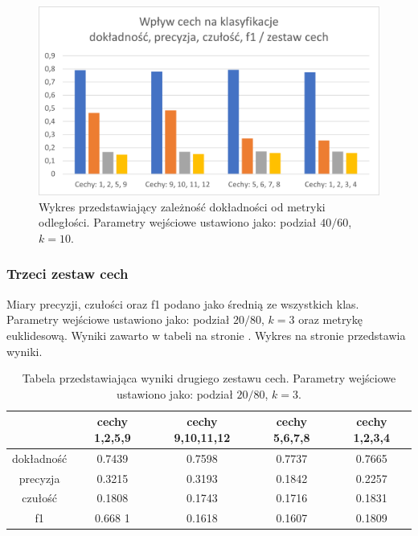 \documentclass{classrep}
\begin{document}
\begin{figure}[H]
\label{features_set_2}
\includegraphics[scale=1]{features_set_2}
\caption{Wykres przedstawiający zależność dokładności od metryki odległości. Parametry wejściowe ustawiono jako: podział $40/60$, $k=10$.}
\end{figure}


\subsubsection{Trzeci zestaw cech}
Miary precyzji, czułości oraz f1 podano jako średnią ze wszystkich klas. Parametry wejściowe ustawiono jako: podział $20/80$, $k=3$ oraz metrykę euklidesową. Wyniki zawarto w tabeli na stronie \pageref{tf3}. Wykres na stronie \pageref{features_set_3} przedstawia wyniki.


\begin{table}[H]
\label{tf3}
\begin{tabular}{|c|c|c|c|c|}
\hline  & cechy 1,2,5,9 & cechy 9,10,11,12 & cechy 5,6,7,8 & cechy 1,2,3,4 \\
\hline \hline
dokładność & 0.7439 & 0.7598 & 0.7737 & 0.7665\\
precyzja & 0.3215 & 0.3193 & 0.1842 & 0.2257 \\
czułość & 0.1808 & 0.1743 & 0.1716 & 0.1831\\
f1 & 0.668 1& 0.1618 & 0.1607 & 0.1809 \\
\end{tabular}
\caption{Tabela przedstawiająca wyniki drugiego zestawu cech. Parametry wejściowe ustawiono jako: podział $20/80$, $k=3$.}
\end{table}
\end{document}
